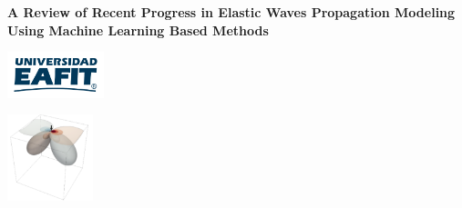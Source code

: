 \documentclass[11pt,twoside]{article}
\begin{document}
\thispagestyle{empty}  


\begin{tcolorbox}[colback=white!20,colframe=gray!20,sharp corners]

\vspace{-2mm} 
\begin{minipage}{10cm}
    \begin{center}
        \textbf{\large A Review of Recent Progress in Elastic Waves Propagation Modeling Using 
        Machine Learning Based Methods}  
    \end{center}                 
\end{minipage} 
\begin{minipage}{3.3cm}
    \begin{center}
        \hspace{-0.2cm}\includegraphics[width=2.8cm]{figs/format/logo_EAFIT.pdf}
    \end{center}
\end{minipage}    
\begin{minipage}{2.2cm}
    \begin{center}
        \includegraphics[width=2.5cm]{figs/format/logo_grupo.pdf}
    \end{center}
\end{minipage}
\vspace{-2mm} 
\end{tcolorbox}
\end{document}
